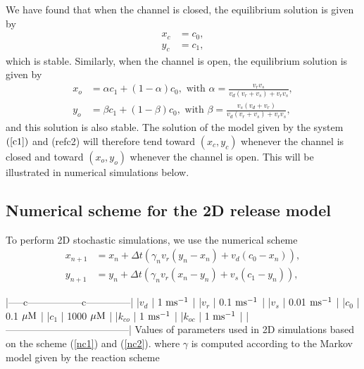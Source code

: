 We have found that when the channel is closed, the equilibrium solution is given
by
\begin{align*}
x_{c} &  =c_{0},\\
y_{c} &  =c_{1},
\end{align*}
which is stable. Similarly, when the channel is open, the equilibrium solution 
is given by
\begin{align*}
x_{o} &  =\alpha c_{1}+\left(  1-\alpha\right)  c_{0},\text{ with }
\alpha=\frac{v_{r}v_{s}}{v_{d}\left(  v_{r}+v_{s}\right)  +v_{r}v_{s}},\\
y_{o} &  =\beta c_{1}+\left(  1-\beta\right)  c_{0},\text{ with }\beta
=\frac{v_{s}\left(  v_{d}+v_{r}\right)  }{v_{d}\left(  v_{r}+v_{s}\right)
+v_{r}v_{s}},
\end{align*}
and this solution is also stable. The solution of the model given by the system $\left(
\ref{c1}\right)$ and (ref{c2}) will therefore tend toward $(x_{c},y_{c})$
whenever the channel is closed and toward  $(x_{o},y_{o})$ whenever the
channel is open. This will be illustrated in numerical simulations below.


\subsection{Numerical scheme for the 2D release model}

To perform 2D stochastic simulations, we use the numerical scheme
\begin{align}
x_{n+1}  &  =x_{n}+\Delta t\left(  \gamma_{n}v_{r}\left(  y_{n}-x_{n}\right)
+v_{d}\left(  c_{0}-x_{n}\right)  \right)  ,\label{nc1}\\
y_{n+1}  &  =y_{n}+\Delta t\left(  \gamma_{n}v_{r}\left(  x_{n}-y_{n}\right)
+v_{s}\left(  c_{1}-y_{n}\right)  \right)  , \label{nc2}
\end{align}

|-----c-----------------c--------------|
|$v_d $      | 1 $\rm{ms^{-1}}$        |
|$v_r $      | 0.1 $\rm{ms^{-1}}$      |
|$v_s $      | 0.01 $\rm{ms^{-1}}$     |
|$c_0 $      | 0.1 $\rm{\mu M}$        |
|$c_1 $      | 1000 $\rm{\mu M}$       |
|$k_{co} $   | 1 $\rm{ms^{-1}}$        |    
|$k_{oc} $   | 1 $\rm{ms^{-1}}$        |
|--------------------------------------|
Values of parameters used in 2D simulations based on the scheme (\ref{nc1}) and (\ref{nc2}). \label{tab:param2D}
where $\gamma$ is computed according to the Markov model given by the reaction scheme

